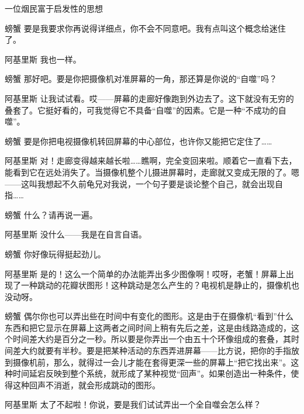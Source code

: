 \begin{dialog}{一位烟民富于启发性的思想}
\begin{dialogue}
\item[螃蟹]要是我要求你再说得详细点，你不会不同意吧。我有点叫这个概念给迷住了。

\item[阿基里斯]我也一样。

\item[螃蟹]那好吧。要是你把摄像机对准屏幕的一角，那还算是你说的“自噬”吗？

\item[阿基里斯]让我试试看。哎——屏幕的走廊好像跑到外边去了。这下就没有无穷的叠套了。它挺好看的，可我觉得它不具备“自噬”的因素。它是一种“不成功的自噬”。

\item[螃蟹]要是你把电视摄像机转回屏幕的中心部位，也许你又能把它定住了……

\item[阿基里斯]对！走廊变得越来越长啦……瞧啊，完全变回来啦。顺着它一直看下去，能看到它在远处消失了。当摄像机整个儿摄进屏幕时，走廊就又变成无限的了。嗯——这叫我想起不久前龟兄对我说，一个句子要是谈论整个自己，就会出现自指……

\item[螃蟹]什么？请再说一遍。

\item[阿基里斯]没什么——我是在自言自语。


\item[螃蟹]你好像玩得挺起劲儿。

\item[阿基里斯\dlnote{（从摄像机那儿转回身来）}]是的！这么一个简单的办法能弄出多少图像啊！哎呀，老蟹！屏幕上出现了一种跳动的花瓣状图形！这种跳动是怎么产生的？电视机是静止的，摄像机也没动呀。

\item[螃蟹]偶尔你也可以弄出些在时间中有变化的图形。这是由于在摄像机“看到”什么东西和把它显示在屏幕上这两者之间时间上稍有先后之差，这是由线路造成的，这个时间差大约是百分之一秒。所以要是你弄出一个由五十个环像组成的套叠，其时间差大约就要有半秒。要是把某种活动的东西弄进屏幕——比方说，把你的手指放到摄像机前，那么，就得过一会儿才能在套得更深一些的屏幕上“把它找出来”。这种时间延宕反映到整个系统，就形成了某种视觉“回声”。如果创造出一种条件，使得这种回声不消逝，就会形成跳动的图形。

\item[阿基里斯]太了不起啦！你说，要是我们试试弄出一个全自噬会怎么样？


\end{dialogue}
\end{dialog}
